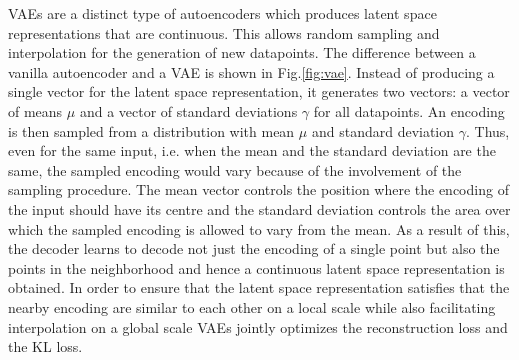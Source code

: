 \ac{VAE}s are a distinct type of autoencoders which produces latent space representations that are continuous. This allows random sampling and interpolation for the generation of new datapoints. The difference between a vanilla autoencoder and a \ac*{VAE} is shown in Fig.\ref{fig:vae}. Instead of producing a single vector for the latent space representation, it generates two vectors: a vector of means $\mu$ and a vector of standard deviations $\gamma$ for all datapoints. An encoding is then sampled from a distribution with mean $\mu$ and standard deviation $\gamma$. Thus, even for the same input, i.e. when the mean and the standard deviation are the same, the sampled encoding would vary because of the involvement of the sampling procedure. The mean vector controls the position where the encoding of the input should have its centre and the standard deviation controls the area over which the sampled encoding is allowed to vary from the mean. As a result of this, the decoder learns to decode not just the encoding of a single point but also the points in the neighborhood and hence a continuous latent space representation is obtained. In order to ensure that the latent space representation satisfies that the nearby encoding are similar to each other on a local scale while also facilitating interpolation on a global scale \ac{VAE}s jointly optimizes the reconstruction loss and the \ac*{KL}\cite{kullback1951information} loss.\cite{kingma2019introduction,vae}

